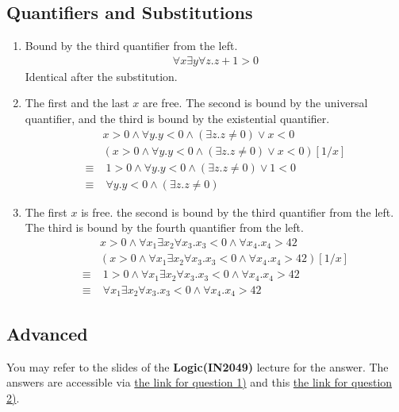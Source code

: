 \documentclass[12pt]{article}
\begin{document}
\subsection*{Quantifiers and Substitutions}
\begin{enumerate}
    \item Bound by the third quantifier from the left. 
    \begin{align*}
        \forall x \exists y \forall z. z + 1 > 0
    \end{align*}
    Identical after the substitution.
    \item The first and the last $x$ are free. The second is bound by the universal quantifier, and 
    the third is bound by the existential quantifier.
    \begin{align*}
        &x > 0 \land \forall y. y < 0 \land (\exists z. z \not= 0) \lor x < 0\\
        &(x > 0 \land \forall y. y < 0 \land (\exists z. z \not= 0) \lor x < 0)[1/x]\\
        \equiv&\; 1 > 0 \land \forall y. y < 0 \land (\exists z. z \not= 0) \lor 1 < 0\\ 
        \equiv&\;  \forall y. y < 0 \land (\exists z. z \not= 0)
    \end{align*}
    \item The first $x$ is free. the second is bound by the third quantifier from the left. 
    The third is bound by the fourth quantifier from the left.
    \begin{align*}
        &x > 0 \land \forall x_1 \exists x_2 \forall x_3. x_3 < 0 \land \forall x_4. x_4 > 42\\
        &(x > 0 \land \forall x_1 \exists x_2 \forall x_3. x_3 < 0 \land \forall x_4. x_4 > 42)[1/x]\\
        \equiv& \; 1 > 0 \land \forall x_1 \exists x_2 \forall x_3. x_3 < 0 \land \forall x_4. x_4 > 42 \\
        \equiv& \; \forall x_1 \exists x_2 \forall x_3. x_3 < 0 \land \forall x_4. x_4 > 42
    \end{align*}
\end{enumerate}

\subsection*{Advanced}
You may refer to the slides of the \textbf{Logic(IN2049)} lecture for the answer. The answers are accessible via 
\hyperref[https://www21.in.tum.de/teaching/logic/SS22/assets/fol.pdf]{the link for question 1)} 
and this \hyperref[https://www21.in.tum.de/teaching/logic/SS22/assets/normal-fol.pdf]{the link for question 2)}.
\end{document}
